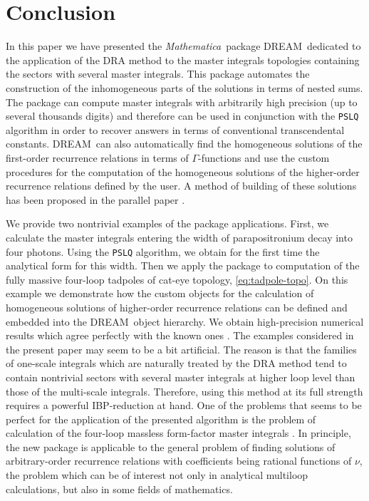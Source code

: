 \documentclass[sort&compress]{elsarticle}
\newcommand{\Mathematica}{\textit{Mathematica}}
\begin{document}
\section{Conclusion}

In this paper we have presented the \Mathematica\ package DREAM\ dedicated to the application of the DRA method to the master integrals topologies containing the sectors with several master integrals.
This package automates the construction of the inhomogeneous parts of the solutions in terms of nested sums.
The package can compute master integrals with arbitrarily high precision (up to several thousands digits) and therefore can be used in conjunction with the \texttt{PSLQ} algorithm in order to recover answers in terms of conventional transcendental constants.
DREAM\ can also automatically find the homogeneous solutions of the first-order recurrence relations in terms of $\Gamma$-functions and use the custom procedures for the computation of the homogeneous solutions of the higher-order recurrence relations defined by the user.
A method of building of these solutions has been proposed in the parallel paper \cite{LeeMingulov:Meromorphic}.

We provide two nontrivial examples of the package applications.
First, we calculate the master integrals entering the width of parapositronium decay into four photons. Using the \texttt{PSLQ} algorithm, we obtain for the first time the analytical form for this width.
Then we apply the package to computation of the fully massive four-loop tadpoles of cat-eye topology, \cref{eq:tadpole-topo}.
On this example we demonstrate how the custom objects for the calculation of homogeneous solutions of higher-order recurrence relations can be defined and embedded into the DREAM\ object hierarchy.
We obtain high-precision numerical results which agree perfectly with the known ones \cite{Laporta2002,SchroderVuorinen2003,Czakon:2005:4loop-tadpoles}.
The examples considered in the present paper may seem to be a bit artificial.
The reason is that the families of one-scale integrals which are naturally treated by the DRA method tend to contain nontrivial sectors with several master integrals at higher loop level than those of the multi-scale integrals.
Therefore, using this method at its full strength requires a powerful IBP-reduction at hand.
One of the problems that seems to be perfect for the application of the presented algorithm is the problem of calculation of the four-loop massless form-factor master integrals \cite{HennSmirnovSteinhauser:4loop-form-factors,HennLeeSmirnovSteinhauser:4loop-form-factors,LeeSmirnovSteinhauser:4loop-form-factors-nf2,ManteuffelSchabinger:4loop-form-factors-nf3}.
In principle, the new package is applicable to the general problem of finding solutions of arbitrary-order recurrence relations with coefficients being rational functions of $\nu$,
the problem which can be of interest not only in analytical multiloop calculations, but also in some fields of mathematics.
\end{document}
